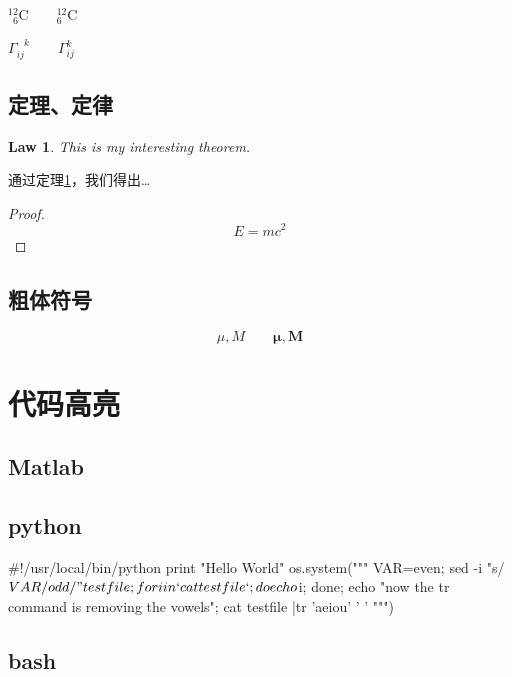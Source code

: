 \documentclass[a4paper,12pt]{article}
\begin{document}
${}^{12}_{\phantom{1}6}\textrm{C} \qquad {}^{12}_{6}\textrm{C} $

$\Gamma_{ij}^{\phantom{ij}k} \qquad \Gamma_{ij}^{k} $ 

\subsection{定理、定律}

\newtheorem{law}{Law} %
\begin{law}\label{law:t} 
This is my interesting theorem.
\end{law}
通过定理\ref{law:t}，我们得出\ldots

\begin{proof}
\[E=mc^2\]
\end{proof}

\subsection{粗体符号}

\begin{displaymath}
\mu, M \qquad
\boldsymbol{\mu}, \boldsymbol{M}
\end{displaymath}

\section{代码高亮}

\subsection{Matlab}


\subsection{python}

\begin{python}
#!/usr/local/bin/python
print "Hello World"
os.system("""
VAR=even;
sed -i "s/$VAR/odd/" testfile;
for i in `cat testfile` ;
do echo $i; done;
echo "now the tr command is removing the vowels";
cat testfile |tr 'aeiou' ' '
""") 
\end{python}

\subsection{bash}
\end{document}
